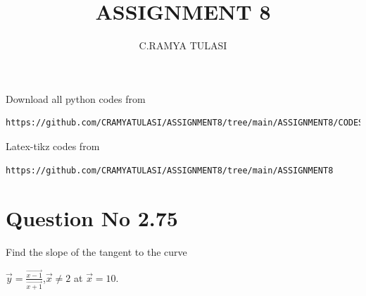 \documentclass[journal,12pt,twocolumn]{IEEEtran}
\begin{document}
     \def\rightbox#1{\makebox[0in][r]{#1}}
     \def\centbox#1{\makebox[0in]{#1}}
     \def\topbox#1{\raisebox{-\baselineskip}[0in][0in]{#1}}
     \def\midbox#1{\raisebox{-0.5\baselineskip}[0in][0in]{#1}}
\vspace{3cm}
\title{ASSIGNMENT 8}
\author{C.RAMYA TULASI}
\maketitle
\newpage
\bigskip
\renewcommand{\thefigure}{\theenumi}
\renewcommand{\thetable}{\theenumi}
Download all python codes from 
\begin{lstlisting}
https://github.com/CRAMYATULASI/ASSIGNMENT8/tree/main/ASSIGNMENT8/CODES
\end{lstlisting}
%
Latex-tikz codes from 
%
\begin{lstlisting}
https://github.com/CRAMYATULASI/ASSIGNMENT8/tree/main/ASSIGNMENT8
\end{lstlisting}
%
\section{Question No 2.75}
Find the slope of the tangent to the curve
 
$\vec{y}=\frac{\vec{x-1}}{\vec{x+1}}$,$\vec{x}\ne 2$ at $\vec{x} = 10$.
\end{document}
